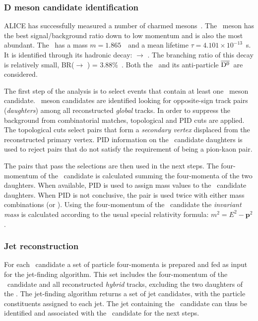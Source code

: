 \documentclass[12pt, a4paper, twoside, titlepage]{article}
\begin{document}
\subsubsection{D meson candidate identification}
ALICE has successfully measured a number of charmed mesons~\cite{ALICE:2012d, ALICE:2012e}.
The \Dzero\ meson has the best signal/background ratio down to low momentum and
is also the most abundant. The \Dzero\ has a mass $m=1.865$~\GeVcsq\ and a mean lifetime $\tau=4.101 \times 10^{-13}$~s.
It is identified through its hadronic decay: \Dzero $\rightarrow$ \pip \kam. The branching ratio of this decay
is relatively small, BR(\Dzero $\rightarrow$ \pip \kam) = 3.88\%~\cite{PDG:2014}. Both the \Dzero\ and its
anti-particle $\overline{\mathrm{D^{0}}}$~are considered.

The first step of the analysis is to select events that contain at least one \Dzero\ meson candidate.
\Dzero\ meson candidates are identified looking for opposite-sign track pairs (\emph{daughters}) among all reconstructed \emph{global} tracks.
In order to suppress the background from combinatorial matches, topological and PID cuts are applied.
The topological cuts select pairs that form a \emph{secondary vertex} displaced from the reconstructed
primary vertex. 
PID information on the \Dzero\ candidate daughters is used to reject pairs that do not satisfy the requirement of being a pion-kaon pair.

The pairs that pass the selections are then used in the next steps.
The four-momentum of the \Dzero\ candidate is calculated summing the four-momenta of the two daughters.
When available, PID is used to assign mass values to the \Dzero\ candidate daughters. When PID is not conclusive,
the pair is used twice with either mass combinations (\pip \kam or \pim \kap). Using the four-momentum of the \Dzero\ candidate
the \emph{invariant mass} is calculated according to the usual special relativity formula: $m^2 = E^2 - \bm{p}^2$.

\subsubsection{Jet reconstruction}
For each \Dzero\ candidate a set of particle four-momenta is prepared and fed as input for the jet-finding algorithm.
This set includes the four-momentum of the \Dzero\ candidate and all reconstructed \emph{hybrid} tracks,
excluding the two daughters of the \Dzero. The jet-finding algorithm returns a set of jet candidates, with the particle constituents
assigned to each jet. The jet containing the \Dzero\ candidate can thus be identified and associated with the \Dzero\ candidate for the next steps.
\end{document}
